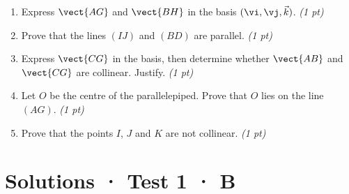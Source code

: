 \begin{enumerate}

\item Express $\vect{AG}$ and $\vect{BH}$ in the basis $(\vi,\vj,\vec k)$. \hfill\textit{(1 pt)}

\item Prove that the lines $(IJ)$ and $(BD)$ are parallel. \hfill\textit{(1 pt)}

\item Express $\vect{CG}$ in the basis, then determine whether $\vect{AB}$ and $\vect{CG}$ are collinear. Justify. \hfill\textit{(1 pt)}

\item Let $O$ be the centre of the parallelepiped. Prove that $O$ lies on the line $(AG)$. \hfill\textit{(1 pt)}

\item Prove that the points $I$, $J$ and $K$ are not collinear. \hfill\textit{(1 pt)}

\end{enumerate}

\ifmxteacher\mxnewpage

\section*{Solutions · Test 1 · B}\label{cor:1-4}

